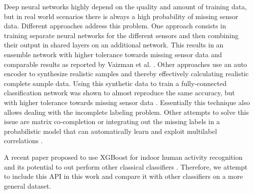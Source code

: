 Deep neural networks highly depend on the quality and amount of training data, but in real world scenarios there is always a high probability of missing sensor data. Different approaches address this problem. One approach consists in training separate neural networks for the different sensors and then combining their output in shared layers on an additional network. This results in an ensemble network with higher tolerance towards missing sensor data and comparable results as reported by Vaizman et al. \cite{Saeed18}. Other approaches use an auto encoder to synthesize realistic samples and thereby effectively calculating realistic complete sample data. Using this synthetic data to train a fully-connected classification network was shown to almost reproduce the same accuracy, but with higher tolerance towards missing sensor data \cite{Saeed18-2}. Essentially this technique also allows dealing with the incomplete labeling problem. Other attempts to solve this issue are matrix co-completion \cite{Xu18} or integrating out the missing labels in a probabilistic model that can automatically learn and exploit multilabel correlations \cite{Bi14}.

A recent paper proposed to use XGBoost for indoor human activity recognition and its potential to out perform other classical classifiers \cite{Zhang19}. Therefore, we attempt to include this API in this work and compare it with other classifiers on a more general dataset. 
